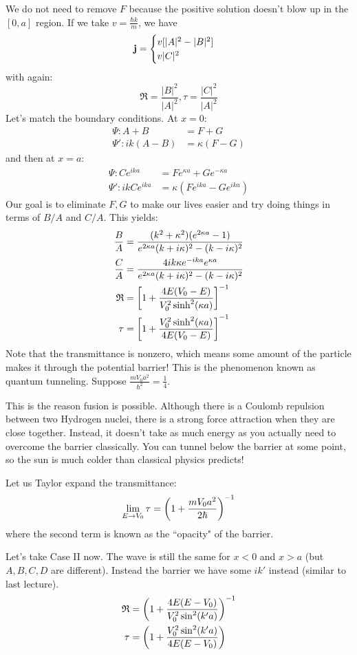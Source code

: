 We do not need to remove $F$ because the positive solution doesn't blow up in the $[0, a]$ region. If we take $v = \frac{\hbar k}{m}$, we
have
\[ \mathbf{j} = \begin{cases}
    v[|A|^2 - |B|^2] \\
    v |C|^2
\end{cases} \]
with again:
\[ \mathfrak{R} = \frac{|B|^2}{|A|^2}, \tau = \frac{|C|^2}{|A|^2} \]
Let's match the boundary conditions. At $x = 0$:
\begin{align*}
    \Psi : A + B &= F + G \\
    \Psi' : ik(A - B) &= \kappa(F - G)
\end{align*}
and then at $x = a$:
\begin{align*}
    \Psi : Ce^{ika} &= Fe^{\kappa a} + Ge^{-\kappa a} \\
    \Psi' : ikCe^{ika} &= \kappa(Fe^{ika} - Ge^{ika})
\end{align*}
Our goal is to eliminate $F, G$ to make our lives easier and try doing things in terms of $B/A$ and $C/A$. This yields:
\begin{align*}
    \frac{B}{A} &= \frac{(k^2 + \kappa^2)(e^{2\kappa a} - 1)}{e^{2\kappa a}(k + i \kappa)^2 - (k - i \kappa)^2} \\
    \frac{C}{A} &= \frac{4ik\kappa e^{-ika} e^{\kappa a}}{e^{2\kappa a}(k + i \kappa)^2 - (k - i \kappa)^2} \\
    \mathfrak{R} &= \qty[1 + \frac{4E(V_0 - E)}{V_0^2 \sinh^2(\kappa a)}]^{-1} \\
    \tau &= \qty[1 + \frac{V_0^2 \sinh^2(\kappa a)}{4E(V_0 - E)}]^{-1}
\end{align*}
Note that the transmittance is nonzero, which means some amount of the particle makes it through the potential barrier!
This is the phenomenon known as quantum tunneling. Suppose $\frac{mV_0 a^2}{\hbar^2} = \frac{1}{4}$.

This is the reason fusion is possible. Although there is a Coulomb repulsion between two Hydrogen nuclei, there is a strong force attraction when they are close together.
Instead, it doesn't take as much energy as you actually need to overcome the barrier classically. You can tunnel
below the barrier at some point, so the sun is much colder than classical physics predicts!

Let us Taylor expand the transmittance:
\[ \lim_{E \to V_0} \tau = \qty(1 + \frac{mV_0a^2}{2\hbar})^{-1} \]
where the second term is known as the ``opacity" of the barrier.

Let's take Case II now. The wave is still the same for $x < 0$ and $x > a$ (but $A, B, C, D$ are different).
Instead the barrier we have some $ik'$ instead (similar to last lecture).
\begin{align*}
    \mathfrak{R} &= \qty(1 + \frac{4E(E - V_0)}{V_0^2 \sin^2(k'a)})^{-1} \\
    \tau &= \qty(1 + \frac{V_0^2 \sin^2(k' a)}{4E(E - V_0)})
\end{align*}

